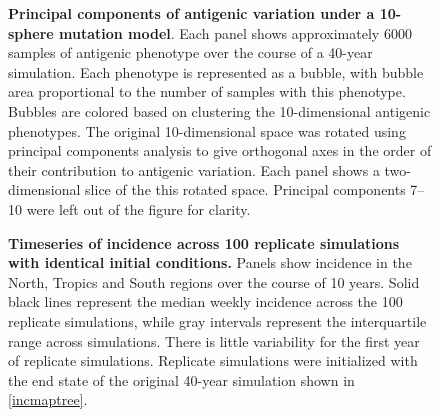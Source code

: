 \begin{figure}[!c]
	\centering
	\caption{\textbf{Principal components of antigenic variation under a 10-sphere mutation model}. Each panel shows approximately 6000 samples of antigenic phenotype over the course of a 40-year simulation.  Each phenotype is represented as a bubble, with bubble area proportional to the number of samples with this phenotype.  Bubbles are colored based on clustering the 10-dimensional antigenic phenotypes.  The original 10-dimensional space was rotated using principal components analysis to give orthogonal axes in the order of their contribution to antigenic variation.  Each panel shows a two-dimensional slice of the this rotated space.  Principal components 7--10 were left out of the figure for clarity.}
	\label{10dgrid}
\end{figure}

\pagebreak

\begin{figure}[!c]
	\centering
	\caption{\textbf{Timeseries of incidence across 100 replicate simulations with identical initial conditions.} Panels show incidence in the North, Tropics and South regions over the course of 10 years.  Solid black lines represent the median weekly incidence across the 100 replicate simulations, while gray intervals represent the interquartile range across simulations.  There is little variability for the first year of replicate simulations.  Replicate simulations were initialized with the end state of the original 40-year simulation shown in \ref{incmaptree}.}
	\label{replicatetimeseries}
\end{figure}

